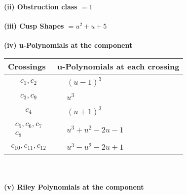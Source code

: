 \documentclass[1p]{elsarticle_modified}
\theoremstyle{definition}
\begin{document}
\flushleft \textbf{(ii) Obstruction class $= 1$}\\~\\
\flushleft \textbf{(iii) Cusp Shapes $= u^2+u+5$}\\~\\
\newpage\renewcommand{\arraystretch}{1}
\flushleft \textbf{(iv) u-Polynomials at the component}\newline \\
\begin{tabular}{m{50pt}|m{274pt}}
Crossings & \hspace{64pt}u-Polynomials at each crossing \\
\hline $$\begin{aligned}c_{1},c_{2}\end{aligned}$$&$\begin{aligned}
&(u-1)^3
\end{aligned}$\\
\hline $$\begin{aligned}c_{3},c_{9}\end{aligned}$$&$\begin{aligned}
&u^3
\end{aligned}$\\
\hline $$\begin{aligned}c_{4}\end{aligned}$$&$\begin{aligned}
&(u+1)^3
\end{aligned}$\\
\hline $$\begin{aligned}c_{5},c_{6},c_{7}\\c_{8}\end{aligned}$$&$\begin{aligned}
&u^3+u^2-2 u-1
\end{aligned}$\\
\hline $$\begin{aligned}c_{10},c_{11},c_{12}\end{aligned}$$&$\begin{aligned}
&u^3- u^2-2 u+1
\end{aligned}$\\
\hline
\end{tabular}\\~\\
\newpage\renewcommand{\arraystretch}{1}
\flushleft \textbf{(v) Riley Polynomials at the component}\newline \\
\end{document}
